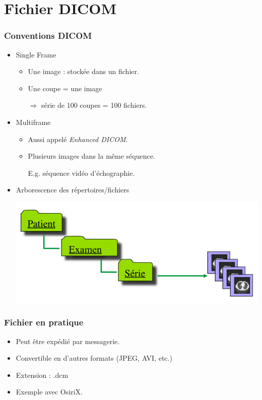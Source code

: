 \section{Fichier DICOM}

\frame
{
	\frametitle{Conventions DICOM}
	\begin{itemize}
		\item Single Frame
		\begin{itemize}
			\item Une image : stock\'ee dans un fichier.
			\item Une coupe = une image
		
			$\Rightarrow$ s\'erie de 100 coupes = 100 fichiers.
		\end{itemize}
		\item Multiframe
		\begin{itemize}
			\item Aussi appel\'e \emph{Enhanced DICOM}.
			\item Plusieurs images dans la m\^eme s\'equence.
			
			E.g. s\'equence vid\'eo d'\'echographie.
		\end{itemize}
		\item Arborescence des r\'epertoires/fichiers
		\begin{center}
			\includegraphics[width=.8\linewidth]{./figures/arborescence.png}
		\end{center}

	\end{itemize}
}

\frame
{
	\frametitle{Fichier en pratique}
	
	\begin{itemize}
		\item Peut \^etre exp\'edi\'e par messagerie.
		\item Convertible en d'autres formats (JPEG, AVI, etc.)
		\item Extension : .dcm
		\item Exemple avec OsiriX.
	\end{itemize}
}

